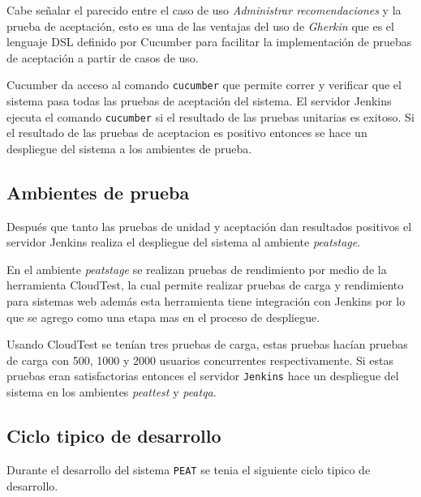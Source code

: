 Cabe señalar el parecido entre el caso de uso \textit{Administrar recomendaciones}
y la prueba de aceptación, esto es una de las ventajas del uso de \textit{Gherkin}
que es el lenguaje DSL definido por Cucumber para facilitar la implementación
de pruebas de aceptación a partir de casos de uso.

Cucumber da acceso al comando \texttt{cucumber} que permite correr y verificar
que el sistema pasa todas las pruebas de aceptación del sistema. El servidor
Jenkins ejecuta el comando \texttt{cucumber} si el resultado de las pruebas
unitarias es exitoso. Si el resultado de las pruebas de aceptacion es positivo
entonces se hace un despliegue del sistema a los ambientes de prueba.

\subsection{Ambientes de prueba}

Después que tanto las pruebas de unidad y aceptación dan resultados positivos el
servidor Jenkins realiza el despliegue del sistema al ambiente \textit{peatstage}.

En el ambiente \textit{peatstage} se realizan pruebas de rendimiento por medio
de la herramienta CloudTest, la cual permite realizar pruebas de carga y
rendimiento para sistemas web además esta herramienta tiene integración con
Jenkins por lo que se agrego como una etapa mas en el proceso de despliegue.

Usando CloudTest se tenían tres pruebas de carga, estas pruebas hacían pruebas de
carga con 500, 1000 y 2000 usuarios concurrentes respectivamente. Si estas pruebas
eran satisfactorias entonces el servidor \texttt{Jenkins} hace un despliegue del
sistema en los ambientes \textit{peattest} y \textit{peatqa}.

\subsection{Ciclo tipico de desarrollo}

Durante el desarrollo del sistema \texttt{PEAT} se tenia el siguiente ciclo
tipico de desarrollo.

